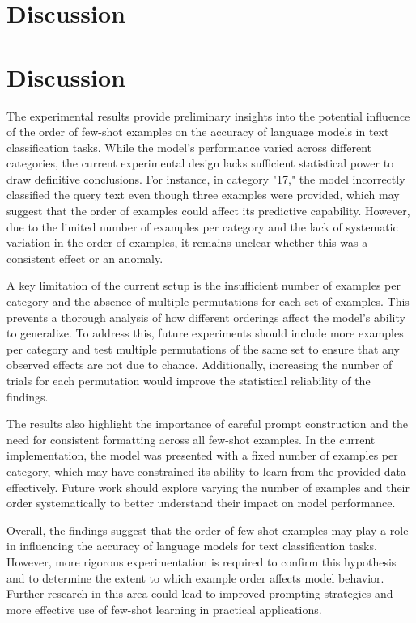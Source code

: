 \documentclass{article}
\begin{document}
\section{Discussion}
\section*{Discussion}

The experimental results provide preliminary insights into the potential influence of the order of few-shot examples on the accuracy of language models in text classification tasks. While the model's performance varied across different categories, the current experimental design lacks sufficient statistical power to draw definitive conclusions. For instance, in category "17," the model incorrectly classified the query text even though three examples were provided, which may suggest that the order of examples could affect its predictive capability. However, due to the limited number of examples per category and the lack of systematic variation in the order of examples, it remains unclear whether this was a consistent effect or an anomaly.

A key limitation of the current setup is the insufficient number of examples per category and the absence of multiple permutations for each set of examples. This prevents a thorough analysis of how different orderings affect the model's ability to generalize. To address this, future experiments should include more examples per category and test multiple permutations of the same set to ensure that any observed effects are not due to chance. Additionally, increasing the number of trials for each permutation would improve the statistical reliability of the findings.

The results also highlight the importance of careful prompt construction and the need for consistent formatting across all few-shot examples. In the current implementation, the model was presented with a fixed number of examples per category, which may have constrained its ability to learn from the provided data effectively. Future work should explore varying the number of examples and their order systematically to better understand their impact on model performance.

Overall, the findings suggest that the order of few-shot examples may play a role in influencing the accuracy of language models for text classification tasks. However, more rigorous experimentation is required to confirm this hypothesis and to determine the extent to which example order affects model behavior. Further research in this area could lead to improved prompting strategies and more effective use of few-shot learning in practical applications.
\end{document}

